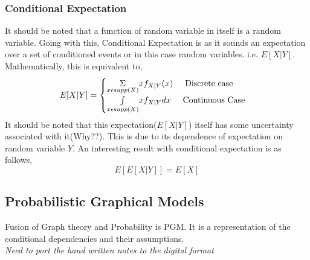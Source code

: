 \documentclass[12pt]{report} %
\begin{document}
	\subsubsection{Conditional Expectation}
	It should be noted that a function of random variable in itself is a random variable. Going with this, Conditional Expectation is as it sounds an expectation over a set of conditioned events or in this case random variables. i.e. $E[X|Y]$. Mathematically, this is equivalent to, 
	\begin{align*}
		E[X|Y] = \begin{cases}
		\underset{x \epsilon supp(X)}{\Sigma}xf_{X|Y}(x) \hspace{0.5cm} \text{Discrete case} \\
		\underset{x \epsilon supp(X)}{\int}xf_{X|Y}dx \hspace{0.5cm} \text{Continuous Case} 
		\end{cases} 
	\end{align*} 
	It should be noted that this expectation($E[X|Y]$) itself has some uncertainty associated with it(Why??). This is due to its dependence of expectation on random variable $Y$. An interesting result with conditional expectation is as follows, 
	\begin{equation*}
		E[E[X|Y]] = E[X]
	\end{equation*}
	\begin{center}
		\subsection*{Probabilistic Graphical Models}
	\end{center}
	Fusion of Graph theory and Probability is PGM. It is a representation of the conditional dependencies and their assumptions.\\ 
	\textit{Need to port the hand written notes to the digital format}  
\end{document}
